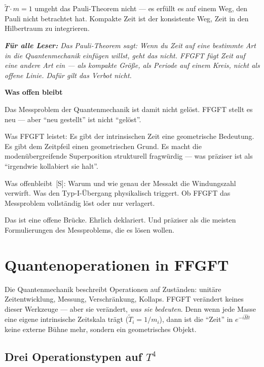 \documentclass[11pt,oneside]{book}
\newcommand{\status}[1]{\penalty10000\,{\scriptsize\textcolor{gray!60}{[#1]}}}
\newenvironment{laierspur}{%
  \par\vspace{4pt}%
  \noindent\small\itshape\color{blue!60!black}%
  \textbf{Für alle Leser:}\enspace\ignorespaces}{%
  \par\vspace{4pt}\normalsize\normalfont\normalcolor}
\begin{document}
$\tilde{T}\cdot m=1$ umgeht das Pauli-Theorem nicht — es erfüllt es auf einem Weg,
den Pauli nicht betrachtet hat. Kompakte Zeit ist der konsistente
Weg, Zeit in den Hilbertraum zu integrieren.


\begin{laierspur}
Das Pauli-Theorem sagt: Wenn du Zeit auf eine bestimmte
Art in die Quantenmechanik einfügen willst, geht das nicht. FFGFT
fügt Zeit auf eine andere Art ein — als kompakte Größe, als Periode
auf einem Kreis, nicht als offene Linie. Dafür gilt das Verbot nicht.
\end{laierspur}

\textbf{Was offen bleibt}


Das Messproblem der Quantenmechanik ist damit nicht gelöst. FFGFT stellt
es neu — aber \enquote{neu gestellt} ist nicht \enquote{gelöst}.


Was FFGFT leistet: Es gibt der intrinsischen Zeit eine geometrische
Bedeutung. Es gibt dem Zeitpfeil einen geometrischen Grund. Es macht die
modenübergreifende Superposition strukturell fragwürdig — was präziser
ist als \enquote{irgendwie kollabiert sie halt}.


Was offenbleibt \status{S}: Warum und wie genau der Messakt die Windungszahl
verwirft. Was den Typ-I-Übergang physikalisch triggert. Ob FFGFT das
Messproblem vollständig löst oder nur verlagert.


Das ist eine offene Brücke. Ehrlich deklariert. Und präziser als
die meisten Formulierungen des Messproblems, die es lösen wollen.






\chapter{Quantenoperationen in FFGFT}

Die Quantenmechanik beschreibt Operationen auf Zuständen: unitäre
Zeitentwicklung, Messung, Verschränkung, Kollaps. FFGFT verändert
keines dieser Werkzeuge — aber sie verändert, \textit{was sie bedeuten}.
Denn wenn jede Masse eine eigene intrinsische Zeitskala trägt
($\tilde{T}_i = 1/m_i$), dann ist die \enquote{Zeit} in $e^{-i\hat{H}t}$
keine externe Bühne mehr, sondern ein geometrisches Objekt.

\section*{Drei Operationstypen auf $T^4$}
\end{document}
